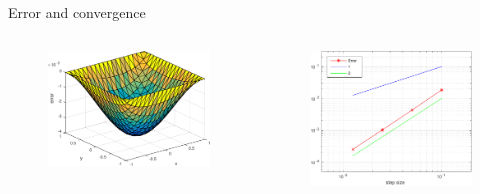 \documentclass[screen]{beamer}
\begin{document}
\begin{frame}
Error and convergence


\begin{columns}   
    \begin{column}{.5\linewidth}
        \begin{figure}
  		\includegraphics[scale=0.35]{figures/error_linEl}
  		\end{figure}
    \end{column}   
    \begin{column}{.5\linewidth}

        \begin{figure}
  		\includegraphics[scale=0.35]{figures/conv_linEl}
  		\end{figure}
    \end{column}
  \end{columns}

\end{frame}
\end{document}
